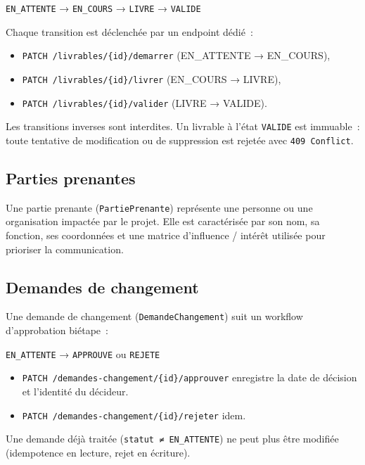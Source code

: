 \begin{center}
\texttt{EN\_ATTENTE} → \texttt{EN\_COURS} → \texttt{LIVRE} → \texttt{VALIDE}
\end{center}

Chaque transition est déclenchée par un endpoint dédié~:
\begin{itemize}
  \item \texttt{PATCH /livrables/\{id\}/demarrer} (EN\_ATTENTE → EN\_COURS),
  \item \texttt{PATCH /livrables/\{id\}/livrer} (EN\_COURS → LIVRE),
  \item \texttt{PATCH /livrables/\{id\}/valider} (LIVRE → VALIDE).
\end{itemize}

Les transitions inverses sont interdites. Un livrable à l'état \texttt{VALIDE} est immuable~: toute
tentative de modification ou de suppression est rejetée avec \texttt{409 Conflict}.

\subsection{Parties prenantes}

Une partie prenante (\texttt{PartiePrenante}) représente une personne ou une organisation impactée
par le projet. Elle est caractérisée par son nom, sa fonction, ses coordonnées et une matrice
d'influence / intérêt utilisée pour prioriser la communication.

\subsection{Demandes de changement}

Une demande de changement (\texttt{DemandeChangement}) suit un workflow d'approbation biétape~:

\begin{center}
\texttt{EN\_ATTENTE} → \texttt{APPROUVE} ou \texttt{REJETE}
\end{center}

\begin{itemize}
  \item \texttt{PATCH /demandes-changement/\{id\}/approuver} enregistre la date de décision et
        l'identité du décideur.
  \item \texttt{PATCH /demandes-changement/\{id\}/rejeter} idem.
\end{itemize}

Une demande déjà traitée (\texttt{statut ≠ EN\_ATTENTE}) ne peut plus être modifiée (idempotence
en lecture, rejet en écriture).

